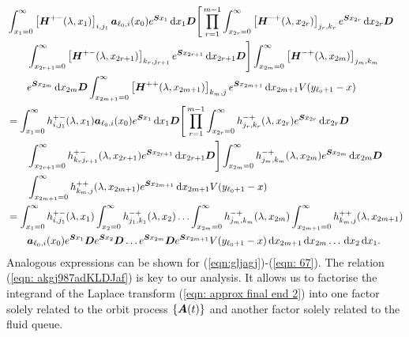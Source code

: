 \begin{align}
	&\int_{x_1=0}^\infty \left[\bs H^{+-}(\lambda,x_1)\right]_{i,j_{1}}\bs   a_{\ell_0,i}(x_0)e^{\bs{S}x_1}\wrt x_1 \bs{D}\nonumber%
	\Bigg[\prod_{r=1}^{m-1} \int_{x_{2r}=0}^\infty \left[\bs H^{-+}(\lambda,x_{2r})\right]_{j_{r},k_r} e^{\bs{S}x_{2r}}\wrt x_{2r} \bs{D}\\&\qquad\nonumber 
	 \int_{x_{2r+1}=0}^\infty \left[\bs H^{+-}(\lambda,x_{2r+1})\right]_{k_r,j_{r+1}} 
	e^{\bs{S}x_{2r+1}} \wrt x_{2r+1} \bs{D}\Bigg] \int_{x_{2m}=0}^\infty \left[\bs H^{-+}(\lambda,x_{2m})\right]_{j_{m},k_m} 
	 \\&\qquad \nonumber e^{\bs{S}x_{2m}} \wrt x_{2m} \bs{D}
	\int_{x_{2m+1}=0}^\infty \left[\bs H^{++}(\lambda,x_{2m+1})\right]_{k_m,j} \nonumber
	e^{\bs{S}x_{2m+1}} \wrt x_{2m+1}V(y_{\ell_0+1}-x)  \nonumber
	\\
	&=\int_{x_1=0}^\infty h^{+-}_{i,j_{1}}(\lambda,x_1)\bs   a_{\ell_0,i}(x_0)e^{\bs{S}x_1}\wrt x_1 \bs{D}\nonumber
	\Bigg[\prod_{r=1}^{m-1} \int_{x_{2r}=0}^\infty h^{-+}_{j_r,k_r}(\lambda,x_{2r}) e^{\bs{S}x_{2r}}\wrt x_{2r}\bs D 
	\\&\nonumber \qquad \int_{x_{2r+1}=0}^\infty h^{+-}_{k_rj_{r+1}}(\lambda,x_{2r+1}) e^{\bs{S}x_{2r+1}} \wrt x_{2r+1}\bs D\Bigg]
	\int_{x_{2m}=0}^\infty h^{-+}_{j_{m},k_m}(\lambda, x_{2m}) e^{\bs{S}x_{2m}} \wrt x_{2m} \bs{D}
	\\&\nonumber \qquad \int_{x_{2m+1}=0}^\infty h^{++}_{k_m,j}(\lambda,x_{2m+1}) e^{\bs{S}x_{2m+1}}\wrt x_{2m+1}V(y_{\ell_0+1}-x) \nonumber
	\\&=\int_{x_1=0}^\infty h^{+-}_{i,j_{1}}(\lambda,x_1)
	\int_{x_2=0}^\infty h^{-+}_{j_1,k_1}(\lambda,x_2)
	\hdots \int_{x_{2m}=0}^\infty h^{-+}_{j_{m},k_m}(\lambda, x_{2m})  \int_{x_{2m+1}=0}^\infty h^{++}_{k_m,j}(\lambda,x_{2m+1})\nonumber
	\\&
	 \qquad \bs   a_{\ell_0,i}(x_0)e^{\bs{S}x_1} \bs{D} e^{\bs{S}x_2} \bs{D}\dots e^{\bs{S}x_{2m}}  \bs{D}e^{\bs{S}x_{2m+1}} V(y_{\ell_0+1}-x)  \wrt x_{2m+1} \wrt x_{2m}\dots\wrt x_2 \wrt x_1. \label{eqn: approx final end 2}
\end{align}
Analogous expressions can be shown for (\ref{eqn:gljagj})-(\ref{eqn: 67}). The relation (\ref{eqn: akgj987adKLDJaf}) is key to our analysis. It allows us to factorise the integrand of the Laplace transform (\ref{eqn: approx final end 2}) into one factor solely related to the orbit process \(\{\boldsymbol A(t)\}\) and another factor solely related to the fluid queue. 

